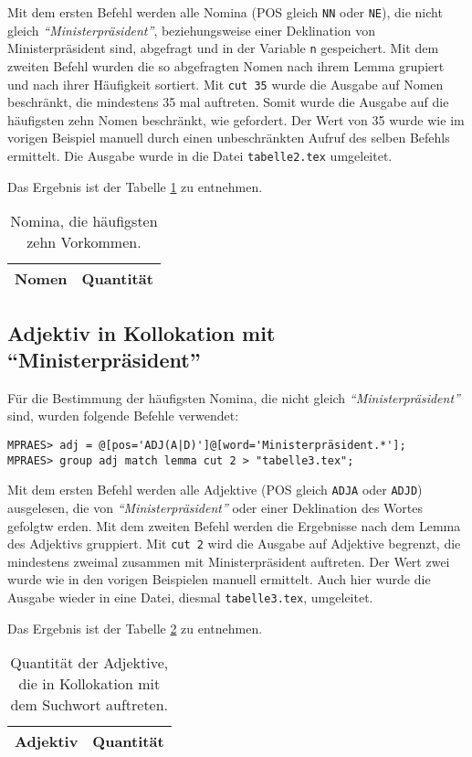 \documentclass[%
	type=document,%
  	style=article,%
  	media=print,
  	pages=oneside,%
  	prefixLecturer=Dozenten:,
  	author=multiple,
]{unihildesheim} %
\begin{document}
Mit dem ersten Befehl werden alle Nomina (POS gleich \texttt{NN} oder
\texttt{NE}), die nicht gleich \textit{"`Ministerpräsident"'}, beziehungsweise einer
Deklination von Ministerpräsident sind, abgefragt und in der Variable \texttt{n}
gespeichert. Mit dem zweiten Befehl wurden die so abgefragten Nomen nach ihrem Lemma grupiert und
nach ihrer Häufigkeit sortiert. Mit \texttt{cut 35} wurde die Ausgabe auf Nomen
beschränkt, die mindestens 35 mal auftreten. Somit wurde die Ausgabe auf die
häufigsten zehn Nomen beschränkt, wie gefordert. Der Wert von 35 wurde wie im
vorigen Beispiel manuell durch einen unbeschränkten Aufruf des selben
Befehls ermittelt. Die Ausgabe wurde in die Datei \texttt{tabelle2.tex}
umgeleitet.

Das Ergebnis ist der Tabelle \ref{tab:nomina} zu entnehmen.
\begin{table}[htpb]\label{t}
	\center
	\begin{tabularx}{0.35\textwidth}{lr}
		\toprule
		\textbf{Nomen} & \textbf{Quantität}\\
		\midrule
		
		\bottomrule
	\end{tabularx}
	\caption{Nomina, die häufigsten zehn Vorkommen.}
	\label{tab:nomina}
\end{table}

\subsection{Adjektiv in Kollokation mit "`Ministerpräsident"'}
Für die Bestimmung der häufigsten Nomina, die nicht gleich
\textit{"`Ministerpräsident"'} sind, wurden folgende Befehle verwendet:
\begin{Verbatim}[frame=single,label=CQP,commandchars=\\\{\}]
MPRAES> adj = @[pos='ADJ(A|D)']@[word='Ministerpräsident.*'];
MPRAES> group adj match lemma cut 2 > "tabelle3.tex";
\end{Verbatim}
Mit dem ersten Befehl werden alle Adjektive (POS gleich \texttt{ADJA} oder
\texttt{ADJD}) ausgelesen, die von \textit{"`Ministerpräsident"'} oder einer
Deklination des Wortes gefolgtw erden. Mit dem zweiten Befehl werden die Ergebnisse nach dem Lemma des
Adjektivs gruppiert. Mit \texttt{cut 2} wird die Ausgabe auf Adjektive begrenzt,
die mindestens zweimal zusammen mit Ministerpräsident auftreten. Der Wert zwei
wurde wie in den vorigen Beispielen manuell ermittelt. Auch hier wurde die Ausgabe
wieder in eine Datei, diesmal \texttt{tabelle3.tex}, umgeleitet. 

Das Ergebnis ist der Tabelle \ref{tab:adj_mpraes} zu entnehmen.
\begin{table}[htpb]\label{t}
	\center
	\begin{tabularx}{0.5\textwidth}{lr}
		\toprule
		\textbf{Adjektiv} & \textbf{Quantität}\\
		\midrule
		
		\bottomrule
	\end{tabularx}
	\caption{Quantität der Adjektive, die in Kollokation mit dem Suchwort
	auftreten.}
	\label{tab:adj_mpraes}
\end{table}
\end{document}
